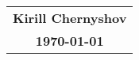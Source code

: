 \documentclass[12pt]{article}
\newcommand{\name}{Kirill Chernyshov}
\begin{document}
\layout
\begin{center}
\begin{tabular}{c}
\textbf{\name} \\
\textbf{\today}
\end{tabular}
\end{center}
\doublespacing
\end{document}
